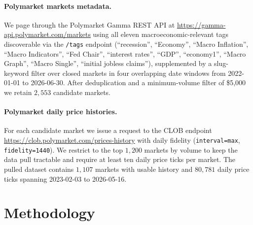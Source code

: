 \documentclass{article}
\begin{document}
\paragraph{Polymarket markets metadata.}
We page through the Polymarket Gamma REST API at
\url{https://gamma-api.polymarket.com/markets} using all eleven
macroeconomic-relevant tags discoverable via the \texttt{/tags} endpoint
(``recession'', ``Economy'', ``Macro Inflation'', ``Macro Indicators'',
``Fed Chair'', ``interest rates'', ``GDP'', ``economy1'',
``Macro Graph'', ``Macro Single'', ``initial jobless claims''),
supplemented by a slug-keyword filter over closed markets in four
overlapping date windows from 2022-01-01 to 2026-06-30. After
deduplication and a minimum-volume filter of \$5{,}000 we retain
$2{,}553$ candidate markets.

\paragraph{Polymarket daily price histories.}
For each candidate market we issue a request to the CLOB endpoint
\url{https://clob.polymarket.com/prices-history} with daily fidelity
(\texttt{interval=max}, \texttt{fidelity=1440}). We restrict to the
top $1{,}200$ markets by volume to keep the data pull tractable and
require at least ten daily price ticks per market. The pulled dataset
contains $1{,}107$ markets with usable history and $80{,}781$ daily
price ticks spanning 2023-02-03 to 2026-05-16.

\section{Methodology}
\end{document}
